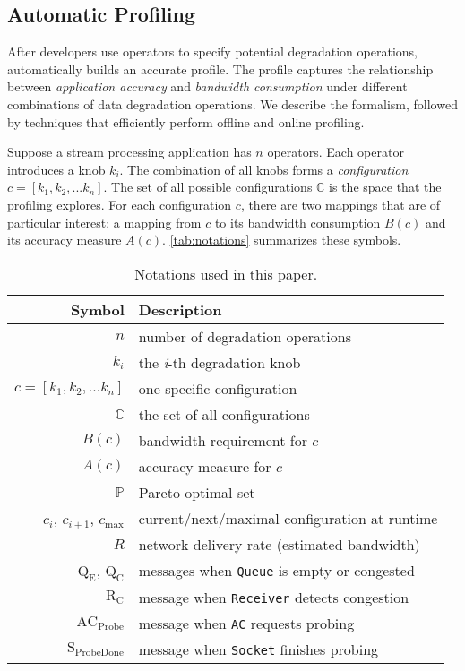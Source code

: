 \subsection{Automatic Profiling}
\label{sec:automatic-profiling}

After developers use \maybe{} operators to specify potential degradation
operations, \sysname{} automatically builds an accurate profile. The profile
captures the relationship between \textit{application accuracy} and
\textit{bandwidth consumption} under different combinations of data degradation
operations. We describe the formalism, followed by techniques that efficiently
perform offline and online profiling.

 Suppose a stream processing application has $n$
\maybe{} operators. Each operator introduces a knob $k_i$. The combination of
all knobs forms a \textit{configuration} $c = [k_{1}, k_{2}, ... k_{n}]$. The
set of all possible configurations $\mathbb{C}$ is the space that the profiling
explores. For each configuration $c$, there are two mappings that are of
particular interest: a mapping from $c$ to its bandwidth consumption $B(c)$ and
its accuracy measure $A(c)$. \autoref{tab:notations} summarizes these symbols.


\begin{table}
  \centering
  \begin{tabular}{r l}
    \toprule
    \textbf{Symbol} & \textbf{Description} \\
    \midrule
    $n$ & number of degradation operations \\
    $k_i$ & the \textit{i}-th degradation knob \\
    $c = [k_{1}, k_{2}, ... k_{n}]$ & one specific configuration \\
    $\mathbb{C}$ & the set of all configurations \\
    \midrule
    $B(c)$ & bandwidth requirement for $c$ \\
    $A(c)$ & accuracy measure for $c$ \\
    $\mathbb{P}$ & Pareto-optimal set \\
    \midrule
    $c_i$, $c_{i+1}$, $c_{\max}$ & current/next/maximal configuration at runtime \\
    $R$ & network delivery rate (estimated bandwidth) \\
    $\text{Q}_\text{E}$, $\text{Q}_\text{C}$ & messages when \texttt{Queue} is empty or congested \\
    $\text{R}_\text{C}$ & message when \texttt{Receiver} detects congestion \\
    $\text{AC}_\text{Probe}$ & message when \texttt{AC} requests probing \\
    $\text{S}_\text{ProbeDone}$ & message when \texttt{Socket} finishes probing \\
    \bottomrule
  \end{tabular}
  \vspace{0.3em}
  \caption{Notations used in this paper.}
  \label{tab:notations}
\end{table}

